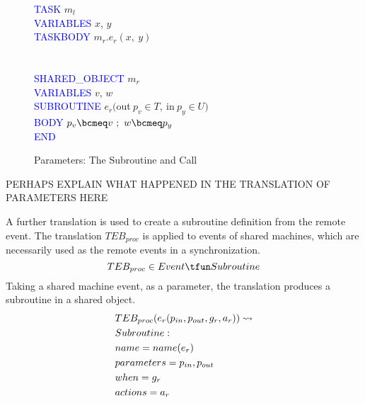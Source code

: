\begin{figure}
\centering
\begin{minipage}{0.49\textwidth}
\textcolor{blue}{TASK} $m_l$\\
\textcolor{blue}{VARIABLES} $x$, $y$\\
\textcolor{blue}{TASKBODY} $m_r.e_r(x,~y)$ \\
 \\
 \\
\textcolor{blue}{SHARED\_OBJECT} $m_r$\\
\textcolor{blue}{VARIABLES} $v$, $w$\\
\textcolor{blue}{SUBROUTINE} $e_r ($out$~ p_v \in T,~  $in$~ p_y \in U)$ \\
\hspace*{0.2cm}\textcolor{blue}{BODY} $p_v \bcmeq v~ ;~ w \bcmeq p_y$\\
\textcolor{blue}{END}
\end{minipage}
\caption{Parameters: The Subroutine and Call}
\label{fig:dec}
\end{figure}
%

PERHAPS EXPLAIN WHAT HAPPENED IN THE TRANSLATION OF PARAMETERS HERE

A further translation is used to create a subroutine definition from the remote event. The translation $TEB_{proc}$ is applied to events of shared machines, which are necessarily used as the remote events in a synchronization. 
%
\begin{equation}
TEB_{proc} \in Event \tfun Subroutine
\notag
\end{equation}
%
Taking a shared machine event, as a parameter, the translation produces a subroutine in a shared object.
%
\begin{equation}
\begin{split}
&TEB_{proc}(e_r(p_{in}, p_{out}, g_r,a_r)) \leadsto\\
&Subroutine:\\ 
&name = name(e_r)\\
&parameters = p_{in}, p_{out}\\
&when= g_r\\
&actions =  a_r
\notag
\end{split}
\end{equation}
%

%

